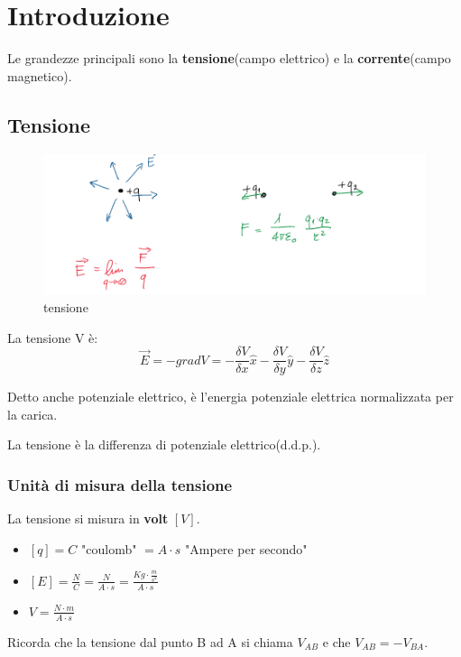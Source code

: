 \section{Introduzione}

Le grandezze principali sono la \textbf{tensione}(campo elettrico) e la \textbf{corrente}(campo magnetico).

\subsection{Tensione}

\begin{figure}[H]
    \centering
    \includegraphics[width=0.7\linewidth]{imgs/tensione}
    \caption{tensione}
    \label{fig:tensione}
\end{figure}

La tensione V è:
\begin{equation}
    \vec{E} = - grad V = -\frac{\delta V}{\delta x} \hat{x}
    -\frac{\delta V}{\delta y} \hat{y}
    -\frac{\delta V}{\delta z} \hat{z}
\end{equation}

Detto anche potenziale elettrico, è l'energia potenziale elettrica normalizzata per la carica.

La tensione è la differenza di potenziale elettrico(d.d.p.).
\subsubsection{Unità di misura della tensione}
La tensione si misura in \textbf{volt} $[V]$.

\begin{itemize}
    \item $[q] = C$ "coulomb" $= A\cdot s$ "Ampere per secondo"
    \item $[E] = \frac{N}{C} = \frac{N}{A\cdot s} =
    \frac{Kg \cdot \frac{m}{s^2}}{A\cdot s}$
    \item $V = \frac{N\cdot m}{A \cdot s}$
\end{itemize}

Ricorda che la tensione dal punto B ad A si chiama $V_{AB}$ e che $V_{AB} = - V_{BA}$.








